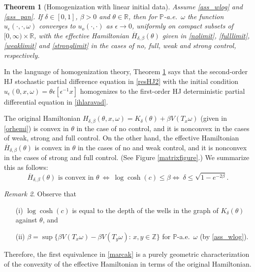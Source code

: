 \documentclass[a4paper]{amsart}
\numberwithin{equation}{section}
\theoremstyle{plain}
\newtheorem{theorem}{\sc Theorem}[section]
\theoremstyle{remark}
\newtheorem{remark}[theorem]{\sc Remark}
\begin{document}
\begin{theorem}[Homogenization with linear initial data]\label{unifhom2}
Assume \eqref{ass_wlog} and \eqref{ass_pan}. If $\delta\in[0,1]$, $\beta>0$ and $\theta\in\mathbb{R}$, then for $\mathbb{P}$-a.e.\ $\omega$ the function $u_{\epsilon}(\cdot,\cdot,\omega)$ converges to $u_o(\cdot,\cdot)$ as ${\epsilon}\to 0$, uniformly on compact subsets of $[0,\infty)\times\mathbb{R}$, 
  {}{with the effective Hamiltonian $\overline H_{\delta,\beta}(\theta)$ given in \eqref{nolimit}, \eqref{fulllimit}, \eqref{weaklimit} and \eqref{stronglimit} in the cases of no, full, weak and strong control, respectively.}
\end{theorem}
{}{In the language of homogenization theory, 
  Theorem \ref{unifhom2} says that
 the second-order HJ stochastic partial difference equation in 
 \eqref{resHJ2} with the initial condition 
 $u_{\epsilon}(0,x,\omega) = \theta{\epsilon}[{\epsilon}^{-1}x]$ homogenizes to the 
 first-order HJ deterministic partial differential 
 equation in \eqref{ihlaravad}. }

The original Hamiltonian $H_{\delta,\beta}(\theta,x,\omega) = K_\delta(\theta) + \beta V(T_x\omega)$ (given in \eqref{orhemi}) is convex in $\theta$ in the case of no control, and it is nonconvex in the cases of weak, strong and full control. On the other hand, the effective Hamiltonian $\overline H_{\delta,\beta}(\theta)$ is convex in $\theta$ in the cases of no and weak control, and it is nonconvex in the cases of strong and full control. (See Figure \ref{matrixfigure}.) We summarize this as follows:
\begin{equation}\label{marcak}
\text{$\overline H_{\delta,\beta}(\theta)$ is convex in $\theta$}\ \iff\ \log\cosh(c)\le\beta \iff\ \delta\le\sqrt{1-e^{-2\beta}}.
\end{equation}

\begin{remark}\label{remzik}
Observe that
\begin{itemize}
	\item [(i)] $\log\cosh(c)$ is equal to the depth of the wells in the graph of $K_\delta(\theta)$ against $\theta$, and
	\item [(ii)] 
	$\beta = \sup\{\beta V(T_x\omega) - \beta V(T_y\omega):\, x,y\in\mathbb{Z}\}$
	for $\mathbb{P}$-a.e.\ $\omega$ (by \eqref{ass_wlog}).
\end{itemize}
Therefore, the first equivalence in \eqref{marcak} is a purely geometric characterization of the convexity of the effective Hamiltonian in terms of the original Hamiltonian.
\end{remark}
\end{document}
